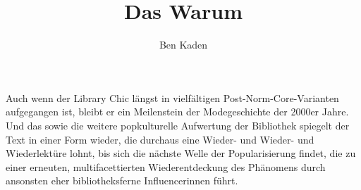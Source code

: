 \documentclass[output=paper]{langsci/langscibook}
\title{Das Warum}
\author{Ben Kaden  \affiliation{\textcolor{red}{BEN AFFIL}}}
\begin{document}
\maketitle

\noindent Auch wenn der Library Chic längst in vielfältigen Post-Norm-Core-Varianten aufgegangen ist, bleibt er ein Meilenstein der Modegeschichte der 2000er Jahre. Und das sowie die weitere popkulturelle Aufwertung der Bibliothek spiegelt der Text in einer Form wieder, die durchaus eine Wieder- und Wieder- und Wiederlektüre lohnt, bis sich die nächste Welle der Popularisierung findet, die zu einer erneuten, multifacettierten Wiederentdeckung des Phänomens durch ansonsten eher bibliotheksferne Influencer\*innen führt.
\end{document}
